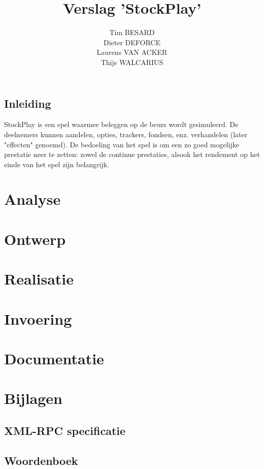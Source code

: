 \documentclass[a4paper,oneside]{report}
\title{Verslag 'StockPlay'}
\author{
Tim BESARD\\
Dieter DEFORCE\\
Laurens VAN ACKER\\
Thijs WALCARIUS
}
\begin{document}
\maketitle
{}
\tableofcontents
{}


%
%

\chapter*{Inleiding}
StockPlay is een spel waarmee beleggen op de beurs wordt gesimuleerd. De deelnemers kunnen aandelen, opties, trackers, fondsen, enz. verhandelen (later "effecten" genoemd). De bedoeling van het spel is om een zo goed mogelijke prestatie neer te zetten: zowel de continue prestaties, alsook het rendement op het einde van het spel zijn belangrijk.

\part{Analyse}


\part{Ontwerp}


\part{Realisatie}


\part{Invoering}


\part{Documentatie}


%
%

\part{Bijlagen}
\appendix

\chapter{XML-RPC specificatie}


\chapter{Woordenboek}

\end{document}
